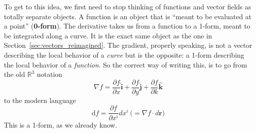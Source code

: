 	To get to this idea, we first need to stop thinking of functions and vector fields as totally separate objects. A function is an object that is ``meant to be evaluated at a point'' (\textbf{0-form}). The derivative takes us from a function to a 1-form, meant to be integrated along a curve. It is the exact same object as the one in Section~\ref{sec:vectors_reimagined}. The gradient, properly speaking, is not a vector describing the local behavior of a \emph{curve} but is the opposite: a 1-form describing the local behavior of a \emph{function}.
	So the correct way of writing this, is to go from the old $\mathbb{R}^3$ notation
	\begin{equation*}
		\nabla f = \frac{\partial f}{\partial x} \hat{\mathbf i}
					+\frac{\partial f}{\partial y} \hat{\mathbf j}
					+\frac{\partial f}{\partial k} \hat{\mathbf k}
	\end{equation*}
	to the modern language
	\begin{equation}
		\mathrm d f  = \frac{\partial f}{\partial x^i} dx^i ~\Big(= \nabla f \cdot d \mathbf r\Big)
	\end{equation}
	This is a 1-form, as we already know.
	
